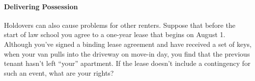 \paragraph{Delivering Possession}

Holdovers can also cause problems for other renters.  Suppose that before the
start of law school you agree to a one-year lease that begins on August 1. 
Although you've signed a binding lease agreement and have received a set of
keys, when your van pulls into the driveway on move-in day, you find that the
previous tenant hasn't left ``your'' apartment.  If the lease doesn't include a
contingency for such an event, what are your rights? 

